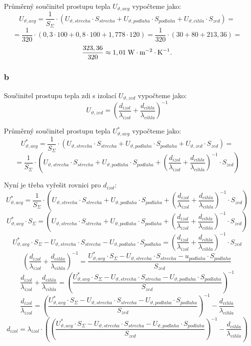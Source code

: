 \documentclass{article}
\begin{document}
Průměrný součinitel prostupu tepla $U_{\vartheta,avg}$ vypočteme jako:
$$
    U_{\vartheta,avg} = \frac{1}{S_{\Sigma}} \cdot (U_{\vartheta,strecha} \cdot S_{strecha} + U_{\vartheta,podlaha} \cdot S_{podlaha} + U_{\vartheta,cihla} \cdot S_{zed}) =
$$
$$
    = \frac{1}{320} \cdot \left( 0,3 \cdot 100 + 0,8 \cdot 100 + 1,778 \cdot 120 \right) = \frac{1}{320} \cdot (30 + 80 + 213,36) =
$$
$$
    \frac{323,36}{320} \approx 1,01 \; \textrm{W} \cdot \textrm{m}^{-2} \cdot \textrm{K}^{-1}.
$$


\subsubsection{b}
Součinitel prostupu tepla zdi s izolací $U_{\vartheta,zed}$ vypočteme jako:
$$
    U_{\vartheta,zed} = \left( \frac{d_{izol}}{\lambda_{izol}} + \frac{d_{cihla}}{\lambda_{cihla}} \right)^{-1}
$$

Průměrný součinitel prostupu tepla $U_{\vartheta,avg}^{*}$ vypočteme jako:
$$
    U_{\vartheta,avg}^{*} = \frac{1}{S_{\Sigma}} \cdot (U_{\vartheta,strecha} \cdot S_{strecha} + U_{\vartheta,podlaha} \cdot S_{podlaha} + U_{\vartheta,zed} \cdot S_{zed}) =
$$
$$
    = \frac{1}{S_{\Sigma}} \cdot (U_{\vartheta,strecha} \cdot S_{strecha} + U_{\vartheta,podlaha} \cdot S_{podlaha} + \left( \frac{d_{izol}}{\lambda_{izol}} + \frac{d_{cihla}}{\lambda_{cihla}} \right)^{-1} \cdot S_{zed})
$$

Nyní je třeba vyřešit rovnici pro $d_{izol}$:
$$
    U_{\vartheta,avg}^{*} = \frac{1}{S_{\Sigma}} \cdot (U_{\vartheta,strecha} \cdot S_{strecha} + U_{\vartheta,podlaha} \cdot S_{podlaha} + \left( \frac{d_{izol}}{\lambda_{izol}} + \frac{d_{cihla}}{\lambda_{cihla}} \right)^{-1} \cdot S_{zed})
$$
$$
    U_{\vartheta,avg}^{*} \cdot S_{\Sigma} =  (U_{\vartheta,strecha} \cdot S_{strecha} + U_{\vartheta,podlaha} \cdot S_{podlaha} + \left( \frac{d_{izol}}{\lambda_{izol}} + \frac{d_{cihla}}{\lambda_{cihla}} \right)^{-1} \cdot S_{zed})
$$
$$
    U_{\vartheta,avg}^{*} \cdot S_{\Sigma} - U_{\vartheta,strecha} \cdot S_{strecha} - U_{\vartheta,podlaha} \cdot S_{podlaha} = \left( \frac{d_{izol}}{\lambda_{izol}} + \frac{d_{cihla}}{\lambda_{cihla}} \right)^{-1} \cdot S_{zed}
$$
$$
    \left( \frac{d_{izol}}{\lambda_{izol}} + \frac{d_{cihla}}{\lambda_{cihla}} \right)^{-1} = \frac{U_{\vartheta,avg}^{*} \cdot S_{\Sigma} - U_{\vartheta,strecha} \cdot S_{strecha} - u_{podlaha} \cdot S_{podlaha}}{S_{zed}}
$$
$$
    \frac{d_{izol}}{\lambda_{izol}} + \frac{d_{cihla}}{\lambda_{cihla}} = \left( \frac{U_{\vartheta,avg}^{*} \cdot S_{\Sigma} - U_{\vartheta,strecha} \cdot S_{strecha} - U_{\vartheta,podlaha} \cdot S_{podlaha}}{S_{zed}} \right)^{-1}
$$
$$
    \frac{d_{izol}}{\lambda_{izol}} = \left( \frac{U_{\vartheta,avg}^{*} \cdot S_{\Sigma} - U_{\vartheta,strecha} \cdot S_{strecha} - U_{\vartheta,podlaha} \cdot S_{podlaha}}{S_{zed}} \right)^{-1} - \frac{d_{cihla}}{\lambda_{cihla}}
$$
$$
    d_{izol} = \lambda_{izol} \cdot \left( \left( \frac{U_{\vartheta,avg}^{*} \cdot S_{\Sigma} - U_{\vartheta,strecha} \cdot S_{strecha} - U_{\vartheta,podlaha} \cdot S_{podlaha}}{S_{zed}} \right)^{-1} - \frac{d_{cihla}}{\lambda_{cihla}} \right)
$$
\end{document}
